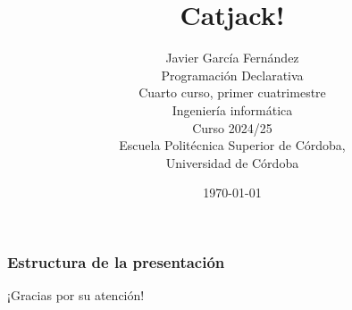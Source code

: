 \documentclass[
	11pt, %
]{beamer}
\title[Catjack!]{Catjack!}
\author[Javier García Fernández]{\scriptsize  Javier García Fernández\\Programación Declarativa \\ Cuarto curso, primer cuatrimestre\\ Ingeniería informática\\ Curso 2024/25 \\ Escuela Politécnica Superior de Córdoba, \\Universidad de Córdoba}
\date[\today]{\today}
\begin{document}

\begin{frame}
	\begin{figure}
	\end{figure}
	\titlepage %
\end{frame}


\begin{frame}
	\frametitle{Estructura de la presentación} %
	\tableofcontents %
\end{frame}



 
 
 
 
 


\begin{frame}
	\begin{center}
		{\Huge ¡Gracias por su atención!}
	\end{center}
\end{frame}

\end{document}
